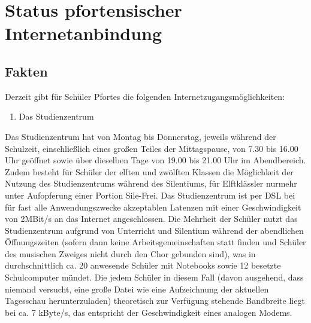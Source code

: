 \documentclass[10pt,a4paper,notitlepage]{scrartcl}
\newcommand{\gfu}{\glqq}
\begin{document}
\section{Status pfortensischer Internetanbindung}
\subsection{Fakten}
\begin{multicols}{2}
Derzeit gibt für Schüler Pfortes die folgenden Internetzugangsmöglichkeiten:
\begin{enumerate}
  \item Das Studienzentrum
\end{enumerate}
Das Studienzentrum hat von Montag bis Donnerstag, jeweils während der Schulzeit, einschließlich eines großen Teiles der Mittagspause, von 7.30 bis 16.00 Uhr geöffnet sowie über dieselben Tage von 19.00 bis 21.00 Uhr im Abendbereich. Zudem besteht für Schüler der elften und zwölften Klassen die Möglichkeit der Nutzung des Studienzentrums während des Silentiums, für Elftklässler nurmehr unter Aufopferung einer Portion \gfu Sile-Frei\grqq. Das Studienzentrum ist per DSL bei für fast alle Anwendungszwecke akzeptablen Latenzen mit einer Geschwindigkeit von 2MBit/s an das Internet angeschlossen. Die Mehrheit der Schüler nutzt das Studienzentrum aufgrund von Unterricht und Silentium während der abendlichen Öffnungszeiten (sofern dann keine Arbeitsgemeinschaften statt finden und Schüler des musischen Zweiges nicht durch den Chor gebunden sind), was in durchschnittlich ca. 20 anwesende Schüler mit Notebooks sowie 12 besetzte Schulcomputer mündet. Die jedem Schüler in diesem Fall (davon ausgehend, dass niemand versucht, eine große Datei wie eine Aufzeichnung der aktuellen Tagesschau herunterzuladen) theoretisch zur Verfügung stehende Bandbreite liegt bei ca. 7 kByte/s, das entspricht der Geschwindigkeit eines analogen Modems.
\end{multicols}
%
\end{document}
